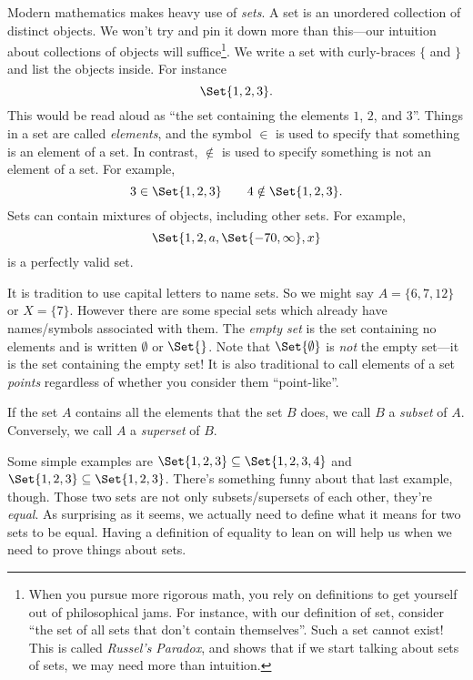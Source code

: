 Modern mathematics makes heavy use of \emph{sets}.  
A set is an unordered collection of distinct objects.  We won't try and pin
it down more than this---our intuition about collections
of objects will suffice\footnote{ When you pursue more rigorous math,
you rely on definitions to get yourself out of philosophical jams.  For instance,
with our definition of set, consider ``the set of all sets that don't
contain themselves''.  Such a set cannot exist!
This is called \emph{Russel's Paradox}, and shows
that if we start talking about sets of sets, we may need more than
intuition.}. We write a set with curly-braces $\{$ and $\}$ and
list the objects inside.  For instance
\[
	\Set{1,2,3}.
\]
This would be read aloud as ``the set containing the elements $1$, $2$, and $3$''.
Things in a set are called \emph{elements},
and the symbol $\in$\index{$\in$} is used to specify that something is an element of a set.
In contrast, $\notin$ is used to specify something is not an element of a set.  For example,
\[
	3\in\Set{1,2,3}\qquad 4\notin\Set{1,2,3}.
\]
Sets can contain mixtures of objects, including other sets.  For example,
\[
	\Set{1,2,a,\Set{-70,\infty}, x}
\]
is a perfectly valid set.

It is tradition to use capital letters to name sets.  So we might say $A=\{6,7,12\}$
or $X=\{7\}$.  However there are some special sets which
already have names/symbols associated with them.
The \emph{empty set} is the set containing no elements
and is written $\emptyset$ or $\Set{}$.  Note that $\Set{\emptyset}$ is \emph{not}
the empty set---it is the set containing the empty set!  It is also traditional
to call elements of a set \emph{points} regardless of whether you
consider them ``point-like''.

If the set $A$ contains all the elements that the set $B$ does, we call $B$ a \emph{subset}
of $A$. Conversely, we call $A$ a \emph{superset} of $B$.  

Some simple examples are $\Set{1,2,3}\subseteq \Set{1,2,3,4}$ and $\Set{1,2,3}\subseteq\Set{1,2,3}$.
There's something funny about that last example, though.  Those two sets are not only subsets/supersets
of each other, they're \emph{equal}.  As surprising as it seems, we actually need to define
what it means for two sets to be equal.
Having a definition of equality to lean on will help us when we need to prove things about sets.

